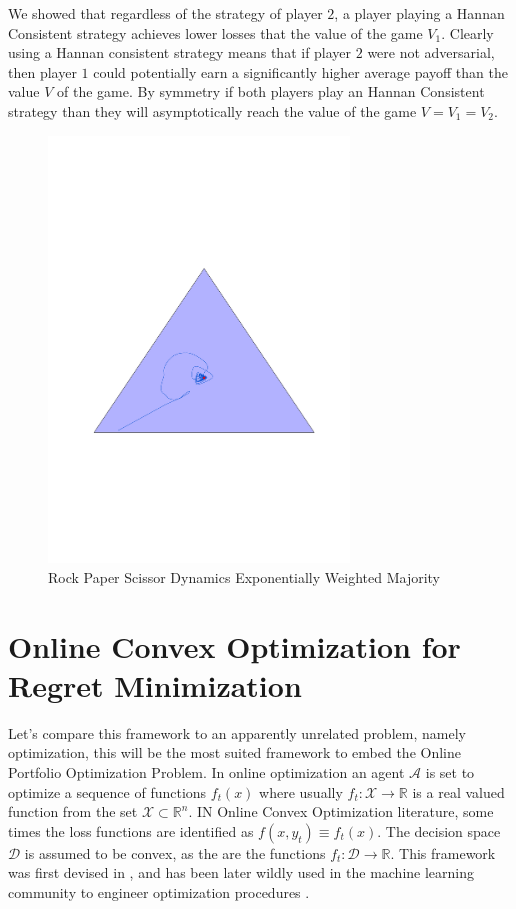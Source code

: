 We showed that regardless of the strategy of player $2$, a player playing a Hannan Consistent strategy achieves lower losses that the value of the game $V_1$. Clearly using a Hannan consistent strategy means that if player $2$ were not adversarial, then player $1$ could potentially earn a significantly higher average payoff than the value $V$ of the game. By symmetry if both players play an Hannan Consistent strategy than they will asymptotically reach the value of the game $V=V_1=V_2$.

\begin{figure}[t!]
    \centering
    \includegraphics[width=8cm]{./img/rps_ewm.pdf}
\caption{Rock Paper Scissor Dynamics Exponentially Weighted Majority}
\label{fig:RPS}
\end{figure}

\section{Online Convex Optimization for Regret Minimization}\label{sec:OCO}

Let's compare this framework to an apparently unrelated problem, namely optimization, this will be the most suited framework to embed the Online Portfolio Optimization Problem. In online optimization an agent $\mathcal A$ is set to optimize a sequence of functions $f_t(x)$ where usually $f_t:\mathcal X\to \mathbb R$ is a real valued function from the set $\mathcal X\subset\mathbb R^n$. IN Online Convex Optimization literature, some times the loss functions are identified as $f(x,y_t)\equiv f_t(x)$.
The decision space $\mathcal D$ is assumed to be convex, as the are the functions $f_t:\mathcal D\to \mathbb R$. This framework was first devised in \cite{zinkevich2003online}, and has been later wildly used in the machine learning community to engineer optimization procedures \cite{shalev2012online}. 

